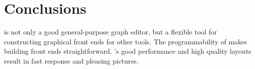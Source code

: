 \chapter{Conclusions}
{\DOTTY} is not only a good general-purpose graph editor, but a flexible tool
for constructing graphical front ends for other tools. The programmability of
{\LEFTY} makes building front ends straightforward. {\DOT}'s good performance
and high quality layouts result in fast response and pleasing pictures.
